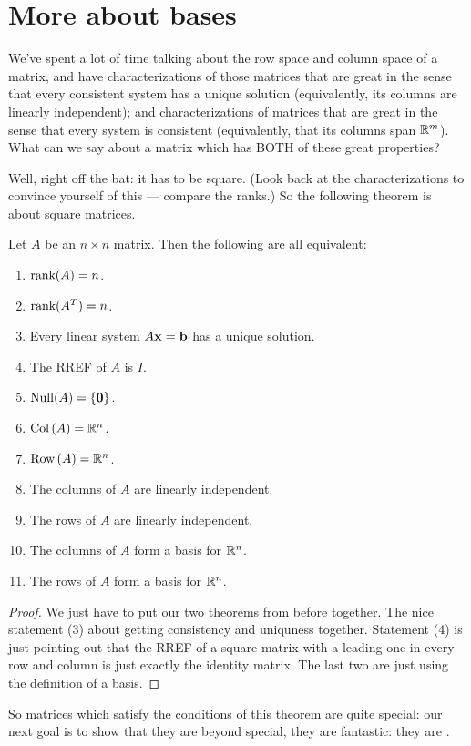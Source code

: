 \section{More about bases}
We've spent a lot of time talking about the row space and column space
of a matrix, and have characterizations of those matrices that are
great in the sense that every consistent system has a unique solution
(equivalently, its columns are linearly independent); and characterizations
of matrices that are great in the sense that every system is consistent
(equivalently, that its columns span $\mathbb{R}^m$).  What can we say
about a matrix which has BOTH of these great properties?

Well, right off the bat:  it has to be square.  (Look back at the
characterizations to convince yourself of this --- compare the
ranks.)  So the following theorem is about square matrices.

\begin{theorem}
Let $A$ be an $n\times n$ matrix. 
Then the  following are all equivalent:
\begin{enumerate}[(1)]
\item $\textrm{rank}(A) = n$.
\item $\textrm{rank}(A^T) = n$.
\item Every linear system $A\mathbf{x}=\mathbf{b}$ has a unique solution.
\item The RREF of $A$ is $I$.
\item $\operatorname{Null}(A) = \{\mathbf{0}\}$.
\item $\operatorname{Col\,}(A) = \mathbb{R}^n$.
\item $\operatorname{Row\,}(A) = \mathbb{R}^n$.
\item The columns of $A$ are linearly independent.
\item The rows of $A$ are linearly independent.
\item The columns of $A$ form a basis for $\mathbb{R}^n$.
\item The rows of $A$ form a basis for $\mathbb{R}^n$.
\end{enumerate}
\end{theorem}

\begin{proof}
We just have to put our two theorems from before together.
The nice statement (3)
about getting consistency and uniquness together.  Statement
(4) is just pointing out that the RREF of a square matrix
with a leading one in every row and column is just exactly
the identity matrix.  The last
two are just using the definition of a basis.
\end{proof}

So matrices which satisfy the conditions of this theorem are
quite special: our next goal is to show that they are beyond
special, they are fantastic:  they are .

